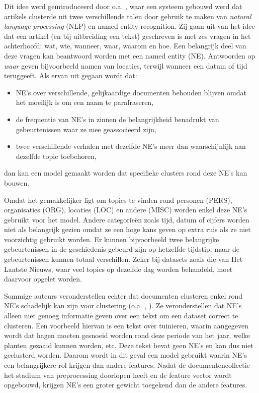 Dit idee werd ge\"introduceerd door o.a. \cite{Montalvo2015}, waar een systeem gebouwd werd dat artikels clusterde uit twee verschillende talen door gebruik te maken van \textit{natural language processing} (NLP) en named entity recognition. Zij gaan uit van het idee dat een artikel (en bij uitbreiding een tekst) geschreven is met zes vragen in het achterhoofd: wat, wie, wanneer, waar, waarom en hoe. Een belangrijk deel van deze vragen kan beantwoord worden met een named entity (NE). Antwoorden op \textit{waar} geven bijvoorbeeld namen van locaties, terwijl wanneer een datum of tijd teruggeeft. Als ervan uit gegaan wordt dat:
\begin{itemize}
\item NE's over verschillende, gelijkaardige documenten behouden blijven omdat het moeilijk is om een naam te parafraseren,
\item de frequentie van NE's in zinnen de belangrijkheid benadrukt van gebeurtenissen waar ze mee geassocieerd zijn,
\item twee verschillende verhalen met dezelfde NE's meer dan waarschijnlijk aan dezelfde topic toebehoren,
\end{itemize} dan kan een model gemaakt worden dat specifieke clusters rond deze NE's kan bouwen.

Omdat het gemakkelijker ligt om topics te vinden rond personen (PERS), organisaties (ORG), locaties (LOC) en andere (MISC) worden enkel deze NE's gebruikt voor het model. Andere categorie\"en zoals tijd, datum of cijfers worden niet als belangrijk gezien omdat ze een hoge kans geven op extra ruis als ze niet voorzichtig gebruikt worden. Er kunnen bijvoorbeeld twee belangrijke gebeurtenissen in de geschiedenis gebeurd zijn op hetzelfde tijdstip, maar de gebeurtenissen kunnen totaal verschillen. Zeker bij datasets zoals die van Het Laatste Nieuws, waar veel topics op dezelfde dag worden behandeld, moet daarvoor opgelet worden. 

Sommige auteurs veronderstellen echter dat documenten clusteren enkel rond NE's schadelijk kan zijn voor clustering (o.a. \cite{Friburger2002}, \cite{Gliozzo2005}). Ze veronderstellen dat NE's alleen niet genoeg informatie geven over een tekst om een dataset correct te clusteren. Een voorbeeld hiervan is een tekst over tuinieren, waarin aangegeven wordt dat hagen moeten gesnoeid worden rond deze periode van het jaar, welke planten gezaaid kunnen worden, etc. Deze tekst bevat geen NE's en kan dus niet geclusterd worden. Daarom wordt in dit geval een model gebruikt waarin NE's een belangrijkere rol krijgen dan andere features. Nadat de documentencollectie het stadium van preprocessing doorlopen heeft en de feature vector wordt opgebouwd, krijgen NE's een groter gewicht toegekend dan de andere features. 

